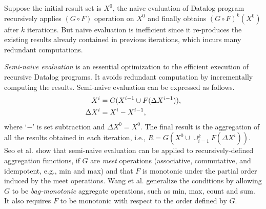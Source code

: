 Suppose the initial result set is $X^0$, the naive evaluation of Datalog program recursively applies $(G\circ F)$ operation on $X^0$ and finally obtains $(G\circ F)^k(X^0)$ after $k$ iterations. But naive evaluation is inefficient since it re-produces the existing results already contained in previous iterations, which incurs many redundant computations.

\textit{Semi-naive evaluation} is an essential optimization to the efficient execution of recursive Datalog programs. It avoids redundant computation by incrementally computing the results. Semi-naive evaluation can be expressed as follows.
\begin{equation}
\label{eq:seminaive}
\begin{aligned}
X^{i}&=G(X^{i-1} \cup F(\Delta X^{i-1})),\notag\\
  \Delta X^i&=X^i-X^{i-1}, 
\end{aligned}
\end{equation}
where `$-$' is set subtraction and $\Delta X^0=X^0$. The final result is the aggregation of all the results obtained in each iteration, i.e., $R=G(X^0\cup \cup_{i=1}^{k}F(\Delta X^i) )$. Seo et al. \cite{Lam:2013:SDE:2510649.2511289} show that semi-naive evaluation can be applied to recursively-defined aggregation functions, if $G$ are \textit{meet} operations (associative, commutative, and idempotent, e.g., min and max) and that $F$ is monotonic under the partial order induced by the meet operations. Wang et al. \cite{Wang:2015:AFR:2824032.2824052} generalize the conditions by allowing $G$ to be \textit{bag-monotonic} aggregate operations, such as min, max, count and sum. It also requires $F$ to be monotonic with respect to the order defined by $G$.







